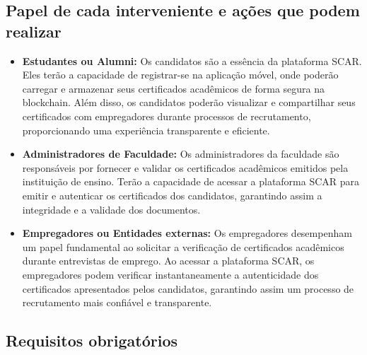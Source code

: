 \documentclass[10pt]{article}
\begin{document}
\subsection*{Papel de cada interveniente e ações que podem realizar}

\begin{itemize}

    \item \textbf{Estudantes ou Alumni:} Os candidatos são a essência da plataforma SCAR. Eles terão a capacidade de registrar-se na
          aplicação móvel, onde poderão carregar e armazenar seus certificados acadêmicos de forma segura na blockchain.
          Além disso, os candidatos poderão visualizar e compartilhar seus certificados com empregadores durante processos
          de recrutamento, proporcionando uma experiência transparente e eficiente.

    \item \textbf{Administradores de Faculdade:} Os administradores da faculdade são responsáveis por fornecer e validar
     os certificados acadêmicos emitidos pela instituição de ensino. Terão a capacidade de acessar a plataforma SCAR
      para emitir e autenticar os certificados dos candidatos, garantindo assim a integridade e a validade dos documentos.

    \item \textbf{Empregadores ou Entidades externas:} Os empregadores desempenham um papel fundamental ao solicitar a verificação de certificados
    acadêmicos durante entrevistas de emprego. Ao acessar a plataforma SCAR, os empregadores podem verificar
    instantaneamente a autenticidade dos certificados apresentados pelos candidatos, garantindo assim um processo
    de recrutamento mais confiável e transparente.

\end{itemize}

\subsection*{Requisitos obrigatórios}
\end{document}
